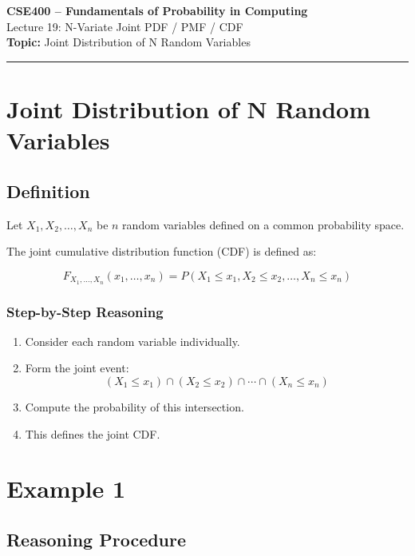 \documentclass[12pt]{article}
\begin{document}
\begin{center}
{\Large \textbf{CSE400 -- Fundamentals of Probability in Computing}}\\[0.2cm]
{\large Lecture 19: N-Variate Joint PDF / PMF / CDF}\\[0.3cm]

\textbf{Topic:} Joint Distribution of N Random Variables\\
\end{center}

\hrule
\vspace{0.4cm}

\section{Joint Distribution of N Random Variables}

\subsection{Definition}

Let $X_1, X_2, \dots, X_n$ be $n$ random variables defined on a common probability space.

The joint cumulative distribution function (CDF) is defined as:

\[
F_{X_1,\dots,X_n}(x_1,\dots,x_n) =
P(X_1 \le x_1, X_2 \le x_2, \dots, X_n \le x_n)
\]

\subsubsection*{Step-by-Step Reasoning}

\begin{enumerate}
\item Consider each random variable individually.
\item Form the joint event:
\[
(X_1 \le x_1) \cap (X_2 \le x_2) \cap \cdots \cap (X_n \le x_n)
\]
\item Compute the probability of this intersection.
\item This defines the joint CDF.
\end{enumerate}

\section{Example 1}

\subsection{Reasoning Procedure}
\end{document}
